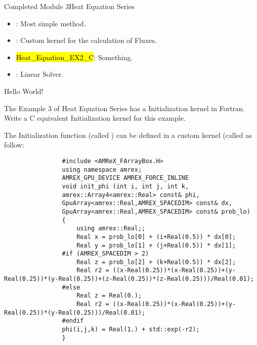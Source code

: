 \documentclass[\string~/GitHub/sthlmNordBeamerTheme/sthlmNordLightDemo.tex]{subfiles}
\begin{document}
\begin{frame}{Completed Module 3}{Heat Equation Series}
    \begin{itemize}
        \item {}: Most simple method.
        \item {}: Custom kernel for the calculation of Fluxes.
        \item \hl{Heat\_Equation\_EX2\_C}: Something.
        \item {}: Linear Solver.
    \end{itemize}

    \remarks Hello World!

    \framebreak
    \prob The Example 3 of Heat Equation Series has a Initialization kernel in Fortran. Write a C equivalent Initialization kernel for this example.

    \framebreak
    \soln The Initialization function (called ) can be defined in a custom kernel (called  as follow:
        \begin{center}
            \begin{verbatim}
                #include <AMReX_FArrayBox.H>
                using namespace amrex;
                AMREX_GPU_DEVICE AMREX_FORCE_INLINE
                void init_phi (int i, int j, int k,
                amrex::Array4<amrex::Real> const& phi,
                GpuArray<amrex::Real,AMREX_SPACEDIM> const& dx,
                GpuArray<amrex::Real,AMREX_SPACEDIM> const& prob_lo)
                {
                    using amrex::Real;;
                    Real x = prob_lo[0] + (i+Real(0.5)) * dx[0];
                    Real y = prob_lo[1] + (j+Real(0.5)) * dx[1];
                #if (AMREX_SPACEDIM > 2)
                    Real z = prob_lo[2] + (k+Real(0.5)) * dx[2];
                    Real r2 = ((x-Real(0.25))*(x-Real(0.25))+(y-Real(0.25))*(y-Real(0.25))+(z-Real(0.25))*(z-Real(0.25)))/Real(0.01);
                #else
                    Real z = Real(0.);
                    Real r2 = ((x-Real(0.25))*(x-Real(0.25))+(y-Real(0.25))*(y-Real(0.25)))/Real(0.01);
                #endif
                phi(i,j,k) = Real(1.) + std::exp(-r2);
                }
            \end{verbatim}
        \end{center}


\end{frame}
\end{document}
